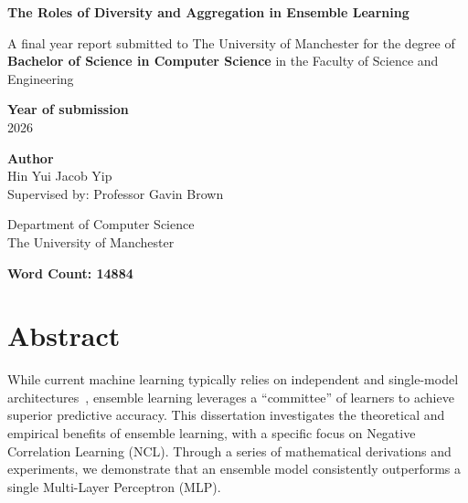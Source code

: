 \documentclass{article}
\begin{document}
\begin{titlepage}

    \begin{center}
        \vspace*{1cm}

        \huge
        \textbf{The Roles of Diversity and Aggregation in Ensemble Learning}

        \vspace{1.5cm}

        \large
        A final year report submitted to The University of Manchester for the degree of \textbf{Bachelor of Science in Computer Science} in the Faculty of Science and Engineering

        \vspace{1.5cm}

        \textbf{Year of submission}
        \\
        2026

        \vspace{2cm}

        \textbf{Author}
        \\
        \large Hin Yui Jacob Yip
        \\
        \large Supervised by: Professor Gavin Brown

        \vfill

        \large
        Department of Computer Science
        \\
        The University of Manchester

        \vspace{0.8cm}
        
    \end{center}
\end{titlepage}


\newpage
\tableofcontents

\vfill
\textbf{Word Count: 14884}
\newpage


\hypersetup{
    linkcolor=blue
}


\newpage
\section*{Abstract}
While current machine learning typically relies on independent and single-model architectures~\cite{zhao2023survey}, ensemble learning leverages a ``committee'' of learners to achieve superior predictive accuracy. This dissertation investigates the theoretical and empirical benefits of ensemble learning, with a specific focus on Negative Correlation Learning (NCL). Through a series of mathematical derivations and experiments, we demonstrate that an ensemble model consistently outperforms a single Multi-Layer Perceptron (MLP). 
\end{document}
